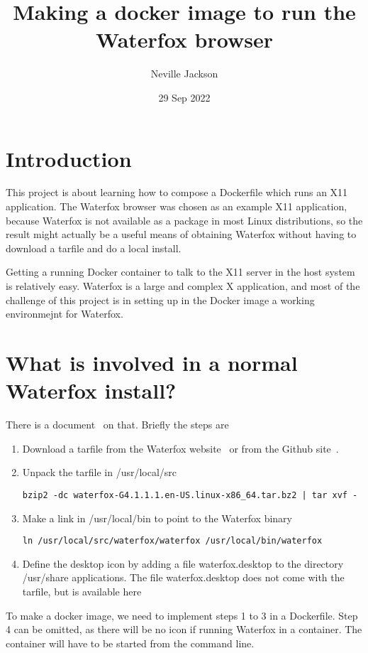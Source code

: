 \documentclass{article}  %
\title{Making a docker image to run the Waterfox browser}
\author{Neville Jackson}
\date{29 Sep 2022}
\begin{document}
 

\maketitle      
\tableofcontents

\section{Introduction} 
This project is about learning how to compose a Dockerfile which runs an X11 application. The Waterfox browser was chosen as an example X11 application, because Waterfox is not available as a package in most Linux distributions, so the result might actually be a useful means of obtaining Waterfox without having to download a tarfile and do a local install. 

Getting a running Docker container to talk to the X11 server in the host system is relatively easy. Waterfox is a large and complex X application, and most of the challenge of this project is in setting up in the Docker image a working environmejnt for Waterfox. 

\section{What is involved in a normal Waterfox install?}
There is a document~\cite{wate:22a} on that.  Briefly the steps are
\begin{enumerate}
\item Download a tarfile from the Waterfox website~\cite{wate:22} or from the Github site~\cite{wate:22b}.
\item  Unpack the tarfile in /usr/local/src
\begin{verbatim}
bzip2 -dc waterfox-G4.1.1.1.en-US.linux-x86_64.tar.bz2 | tar xvf -
\end{verbatim}
\item Make a link in /usr/local/bin to point to the Waterfox binary
\begin{verbatim}
ln /usr/local/src/waterfox/waterfox /usr/local/bin/waterfox
\end{verbatim}
\item Define the desktop icon by adding a file waterfox.desktop to the directory /usr/share applications. The file waterfox.desktop does not come with the tarfile, but is available here~\cite{wate:22a}
\end{enumerate}
To make a docker image, we need to implement steps 1 to 3 in a Dockerfile. Step 4 can be omitted, as there will be no icon if running Waterfox in a container. The container will have to be started from the command line.
\end{document}
